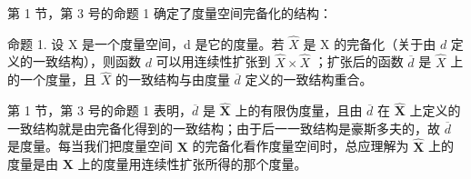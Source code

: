 第 1 节，第 3 号的命题 1 确定了度量空间完备化的结构：

命题 1. 设 X 是一个度量空间，d 是它的度量。若 \(\hat{X}\) 是 X 的完备化（关于由 \(d\) 定义的一致结构），则函数 \(d\) 可以用连续性扩张到 \(\hat{X} \times \hat{X}\) ；扩张后的函数 \(\overline{d}\) 是 \(\hat{X}\) 上的一个度量，且 \(\hat{X}\) 的一致结构与由度量 \(\overline{d}\) 定义的一致结构重合。

第 1 节，第 3 号的命题 1 表明，\(\overline{d}\) 是 \(\hat{\mathbf{X}}\) 上的有限伪度量，且由 \(\overline{d}\) 在 \(\hat{\mathbf{X}}\) 上定义的一致结构就是由完备化得到的一致结构；由于后一一致结构是豪斯多夫的，故 \(\overline{d}\) 是度量。每当我们把度量空间 \(\mathbf{X}\) 的完备化看作度量空间时，总应理解为 \(\hat{\mathbf{X}}\) 上的度量是由 \(\mathbf{X}\) 上的度量用连续性扩张所得的那个度量。

